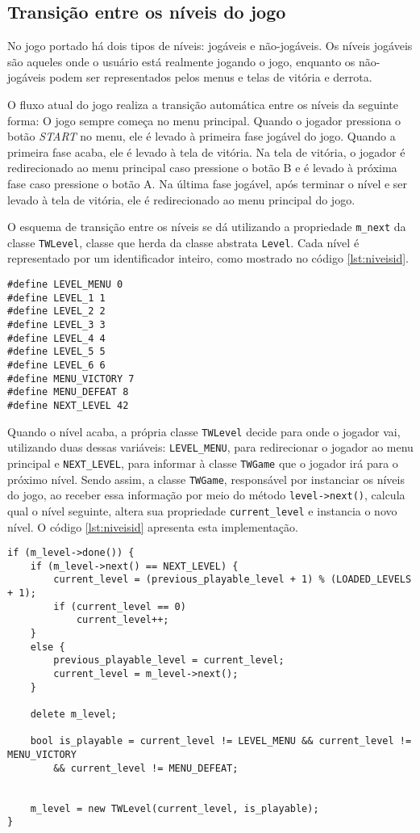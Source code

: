 \subsection{Transição entre os níveis do jogo}

No jogo portado há dois tipos de níveis: jogáveis e não-jogáveis. Os níveis jogáveis são aqueles onde o usuário está realmente jogando o jogo, enquanto os não-jogáveis podem ser representados pelos menus e telas de vitória e derrota.

O fluxo atual do jogo realiza a transição automática entre os níveis da seguinte forma: O jogo sempre começa no menu principal. Quando o jogador pressiona o botão \textit{START} no menu, ele é levado à primeira fase jogável do jogo. Quando a primeira fase acaba, ele é levado à tela de vitória. Na tela de vitória, o jogador é redirecionado ao menu principal caso pressione o botão B e é levado à próxima fase caso pressione o botão A. Na última fase jogável, após terminar o nível e ser levado à tela de vitória, ele é redirecionado ao menu principal do jogo.

O esquema de transição entre os níveis se dá utilizando a propriedade \texttt{m\_next} da classe \texttt{TWLevel}, classe que herda da classe abstrata \texttt{Level}. Cada nível é representado por um identificador inteiro, como mostrado no código \ref{lst:niveisid}.

\begin{lstlisting}[label={lst:niveisid},caption={Identificação dos níveis do jogo.]}]
#define LEVEL_MENU 0
#define LEVEL_1 1
#define LEVEL_2 2
#define LEVEL_3 3
#define LEVEL_4 4
#define LEVEL_5 5
#define LEVEL_6 6
#define MENU_VICTORY 7
#define MENU_DEFEAT 8
#define NEXT_LEVEL 42
\end{lstlisting}

Quando o nível acaba, a própria classe \texttt{TWLevel} decide para onde o jogador vai, utilizando duas dessas variáveis: \texttt{LEVEL\_MENU},  para redirecionar o jogador ao menu principal e \texttt{NEXT\_LEVEL}, para informar à classe \texttt{TWGame} que o jogador irá para o próximo nível. Sendo assim, a classe \texttt{TWGame}, responsável por instanciar os níveis do jogo, ao receber essa informação por meio do método \texttt{level->next()}, calcula qual o nível seguinte, altera sua propriedade \texttt{current\_level} e instancia o novo nível. O código \ref{lst:niveisid} apresenta esta implementação.

\begin{lstlisting}[label={lst:niveisid},caption={Transição entre os níveis do jogo.]}]
if (m_level->done()) {
    if (m_level->next() == NEXT_LEVEL) {
        current_level = (previous_playable_level + 1) % (LOADED_LEVELS + 1);
        if (current_level == 0)
            current_level++;
    }
    else {
        previous_playable_level = current_level;
        current_level = m_level->next();
    }

    delete m_level;

    bool is_playable = current_level != LEVEL_MENU && current_level != MENU_VICTORY
        && current_level != MENU_DEFEAT;


    m_level = new TWLevel(current_level, is_playable);
}
\end{lstlisting}

